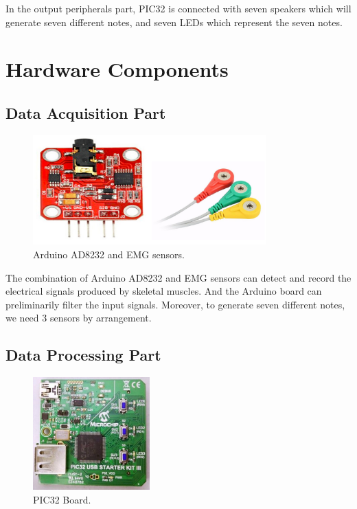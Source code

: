 \documentclass[12pt]{article}
\begin{document}
In the output peripherals part, PIC32 is connected with seven speakers which will generate seven different notes, and seven LEDs which represent the seven notes.


\section{Hardware Components}
\subsection{Data Acquisition Part}

\begin{figure}[H]
\centering
\includegraphics[width=0.8\textwidth]{sensor.png}
\caption{Arduino AD8232 and EMG sensors.}
\end{figure}

The combination of Arduino AD8232 and EMG sensors can detect and record the electrical signals produced by skeletal muscles. And the Arduino board can preliminarily filter the input signals. Moreover, to generate seven different notes, we need 3 sensors by arrangement.

\subsection{Data Processing Part}

\begin{figure}[H]
\centering
\includegraphics[width=0.4\textwidth]{pic32.png}
\caption{PIC32 Board.}
\end{figure}
\end{document}
